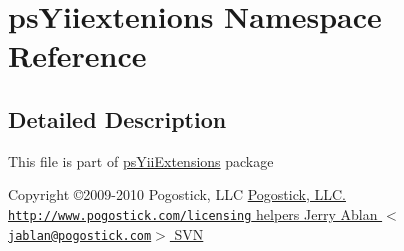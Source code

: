 \hypertarget{namespacepsYiiextenions}{
\section{psYiiextenions Namespace Reference}
\label{namespacepsYiiextenions}
}


\subsection{Detailed Description}
This file is part of \hyperlink{namespacepsYiiExtensions}{psYiiExtensions} package

Copyright \copyright 2009-\/2010 Pogostick, LLC \hyperlink{}{Pogostick, LLC.  \href{http://www.pogostick.com/licensing}{\tt http://www.pogostick.com/licensing}   helpers   Jerry Ablan $<$\href{mailto:jablan@pogostick.com}{\tt jablan@pogostick.com}$>$  SVN    }